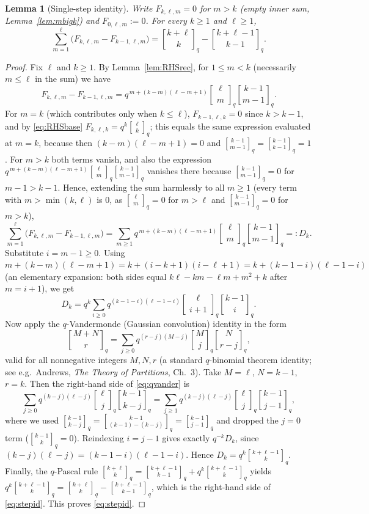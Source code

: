 \documentclass{amsart}
\newtheorem{lemma}{Lemma}
\theoremstyle{definition}
\newcommand{\qbin}[2]{\genfrac{[}{]}{0pt}{}{#1}{#2}_q}
\begin{document}
\begin{lemma}[Single-step identity]\label{lem:step}
Write $F_{k,\ell,m}=0$ for $m>k$ \textup{(}empty inner sum,
Lemma~\ref{lem:mbigk}\textup{)} and $F_{0,\ell,m}:=0$. For every $k\ge1$ and
$\ell\ge1$,
\begin{equation}\label{eq:stepid}
\sum_{m=1}^{\ell}\big(F_{k,\ell,m}-F_{k-1,\ell,m}\big)
=\qbin{k+\ell}{k}-\qbin{k+\ell-1}{k-1}.
\end{equation}
\end{lemma}

\begin{proof}
Fix $\ell$ and $k\ge1$. By Lemma~\ref{lem:RHSrec}, for $1\le m<k$ (necessarily
$m\le\ell$ in the sum) we have
\[
F_{k,\ell,m}-F_{k-1,\ell,m}=q^{\,m+(k-m)(\ell-m+1)}\qbin{\ell}{m}\qbin{k-1}{m-1}.
\]
For $m=k$ (which contributes only when $k\le\ell$), $F_{k-1,\ell,k}=0$ since $k>k-1$,
and by \eqref{eq:RHSbase} $F_{k,\ell,k}=q^{k}\qbin{\ell}{k}$; this equals the same
expression evaluated at $m=k$, because then $(k-m)(\ell-m+1)=0$ and
$\qbin{k-1}{m-1}=\qbin{k-1}{k-1}=1$. For $m>k$ both terms vanish, and also the
expression $q^{\,m+(k-m)(\ell-m+1)}\qbin{\ell}{m}\qbin{k-1}{m-1}$ vanishes there
because $\qbin{k-1}{m-1}=0$ for $m-1>k-1$. Hence, extending the sum harmlessly
to all $m\ge1$ (every term with $m>\min(k,\ell)$ is $0$, as $\qbin{\ell}{m}=0$ for
$m>\ell$ and $\qbin{k-1}{m-1}=0$ for $m>k$),
\begin{equation}\label{eq:Dunified}
\sum_{m=1}^{\ell}\big(F_{k,\ell,m}-F_{k-1,\ell,m}\big)
=\sum_{m\ge1}q^{\,m+(k-m)(\ell-m+1)}\qbin{\ell}{m}\qbin{k-1}{m-1}=:D_k.
\end{equation}
Substitute $i=m-1\ge0$. Using
$m+(k-m)(\ell-m+1)=k+(i-k+1)(i-\ell+1)=k+(k-1-i)(\ell-1-i)$ (an elementary
expansion: both sides equal $k\ell-k m-\ell m+m^2+k$ after $m=i+1$), we get
\[
D_k=q^{k}\sum_{i\ge0}q^{(k-1-i)(\ell-1-i)}\qbin{\ell}{i+1}\qbin{k-1}{i}.
\]
Now apply the $q$-Vandermonde (Gaussian convolution) identity in the form
\begin{equation}\label{eq:qvander}
\qbin{M+N}{r}=\sum_{j\ge0}q^{(r-j)(M-j)}\qbin{M}{j}\qbin{N}{r-j},
\end{equation}
valid for all nonnegative integers $M,N,r$ (a standard $q$-binomial theorem
identity; see e.g.\ Andrews, \emph{The Theory of Partitions}, Ch.~3). Take
$M=\ell$, $N=k-1$, $r=k$. Then the right-hand side of \eqref{eq:qvander} is
\[
\sum_{j\ge0}q^{(k-j)(\ell-j)}\qbin{\ell}{j}\qbin{k-1}{k-j}
=\sum_{j\ge1}q^{(k-j)(\ell-j)}\qbin{\ell}{j}\qbin{k-1}{j-1},
\]
where we used $\qbin{k-1}{k-j}=\qbin{k-1}{(k-1)-(k-j)}=\qbin{k-1}{j-1}$ and dropped
the $j=0$ term ($\qbin{k-1}{k}=0$). Reindexing $i=j-1$ gives exactly
$q^{-k}D_k$, since $(k-j)(\ell-j)=(k-1-i)(\ell-1-i)$. Hence
$D_k=q^{k}\qbin{k+\ell-1}{k}$. Finally, the $q$-Pascal rule
$\qbin{k+\ell}{k}=\qbin{k+\ell-1}{k-1}+q^{k}\qbin{k+\ell-1}{k}$ yields
$q^{k}\qbin{k+\ell-1}{k}=\qbin{k+\ell}{k}-\qbin{k+\ell-1}{k-1}$, which is the
right-hand side of \eqref{eq:stepid}. This proves \eqref{eq:stepid}.
\end{proof}
\end{document}
